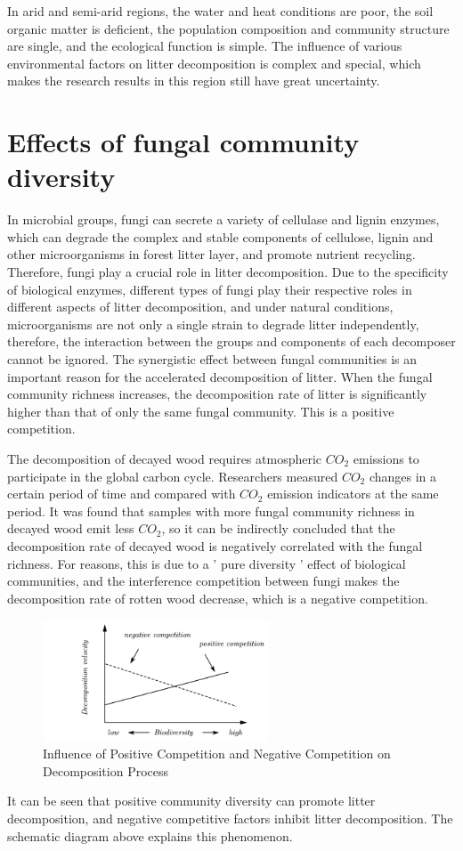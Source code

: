 \documentclass{mcmthesis}
\begin{document}
In arid and semi-arid regions, the water and heat conditions are poor, the soil organic matter is deficient, the population composition and community structure are single, and the ecological function is simple. The influence of various environmental factors on litter decomposition is complex and special, which makes the research results in this region still have great uncertainty.
\section{Effects of fungal community diversity}
In microbial groups, fungi can secrete a variety of cellulase and lignin enzymes, which can degrade the complex and stable components of cellulose, lignin and other microorganisms in forest litter layer, and promote nutrient recycling. Therefore, fungi play a crucial role in litter decomposition. Due to the specificity of biological enzymes, different types of fungi play their respective roles in different aspects of litter decomposition, and under natural conditions, microorganisms are not only a single strain to degrade litter independently, therefore, the interaction between the groups and components of each decomposer cannot be ignored. The synergistic effect between fungal communities is an important reason for the accelerated decomposition of litter. When the fungal community richness increases, the decomposition rate of litter is significantly higher than that of only the same fungal community. This is a positive competition.

The decomposition of decayed wood requires atmospheric $CO_2$ emissions to participate in the global carbon cycle. Researchers measured $CO_2$ changes in a certain period of time and compared with $CO_2$ emission indicators at the same period. It was found that samples with more fungal community richness in decayed wood emit less $CO_2$, so it can be indirectly concluded that the decomposition rate of decayed wood is negatively correlated with the fungal richness. For reasons, this is due to a ' pure diversity ' effect of biological communities, and the interference competition between fungi makes the decomposition rate of rotten wood decrease, which is a negative competition.
\begin{figure}[H]
	\centering
	\includegraphics[width=0.6\textwidth]{img/积极消极竞争.png}
	\caption{Influence of Positive Competition and Negative Competition on Decomposition Process}\label{fig:积极消极竞争}
\end{figure}
It can be seen that positive community diversity can promote litter decomposition, and negative competitive factors inhibit litter decomposition. The schematic diagram above explains this phenomenon.
\end{document}
